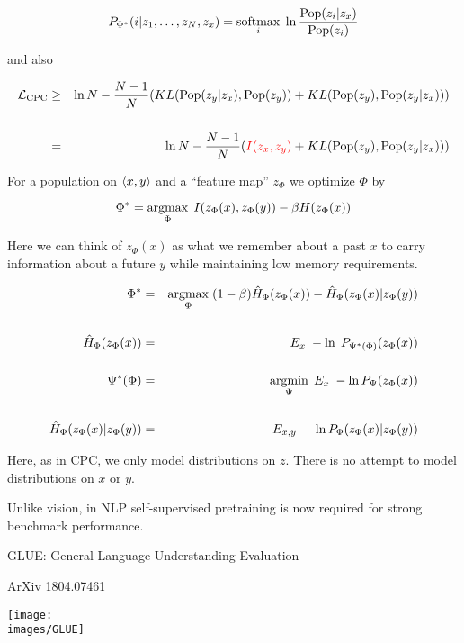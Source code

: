 {$$P_{\Phi^*}(i|z_1,\ldots,z_N,z_x) = \operatorname*{softmax}_i \;\ln \frac{\mathrm{Pop}(z_i|z_x)}{\mathrm{Pop}(z_i)}$$

and also

{\huge
\begin{eqnarray*}
{\cal L}_\mathrm{CPC} & \geq & \ln N - \frac{N-1}{N}(KL(\mathrm{Pop}(z_y|z_x),\mathrm{Pop}(z_y)) + KL(\mathrm{Pop}(z_y),\mathrm{Pop}(z_y|z_x))) \\
\\
& = & \ln N - \frac{N-1}{N}({\color{red} I(z_x,z_y)} + KL(\mathrm{Pop}(z_y),\mathrm{Pop}(z_y|z_x)))
\end{eqnarray*}
}


For a population on ${\mbox{$\langle x,y\rangle$}}$ and a ``feature map'' $z_\Phi$ we optimize $\Phi$ by

\vfill
$$\Phi^* = \operatorname*{argmax}_\Phi \; I(z_\Phi(x),z_\Phi(y)) - \beta H(z_\Phi(x))$$


\vfill
Here we can think of $z_\Phi(x)$ as what we remember about a past $x$ to carry information about a future $y$ while maintaining low memory requirements.


\begin{eqnarray*}
\Phi^* & = & \operatorname*{argmax}_\Phi \; (1-\beta)\hat{H}_\Phi(z_\Phi(x)) - \hat{H}_\Phi(z_\Phi(x)|z_\Phi(y)) \\
\\
\hat{H}_\Phi(z_\Phi(x)) & = & E_x \; -\ln \;P_{\Psi^*(\Phi)}(z_\Phi(x)) \\
\\
\Psi^*(\Phi) & = & \operatorname*{argmin}_\Psi\;E_x\;-\ln P_\Psi(z_\Phi(x)) \\
\\
\hat{H}_\Phi(z_\Phi(x)|z_\Phi(y)) & = & E_{x,y} \; -\ln P_\Phi(z_\Phi(x)|z_\Phi(y)) 
\end{eqnarray*}

\vfill
Here, as in CPC, we only model distributions on $z$.  There is no attempt to model distributions on $x$ or $y$.


Unlike vision, in NLP self-supervised pretraining is now required for strong benchmark performance.

\vfill


GLUE: General Language Understanding Evaluation

\vfill

\centerline{\normalsize ArXiv 1804.07461}
\centerline{\texttt{[image: \\images/GLUE]}}

}
